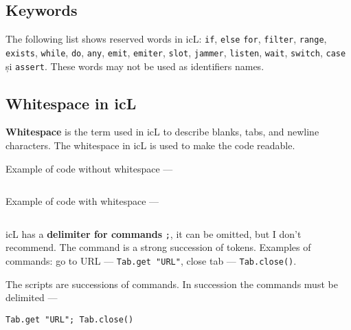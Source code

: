 \subsection{Keywords}

The following list shows reserved words in icL: \texttt{if}, \texttt{else} \texttt{for}, \texttt{filter}, \texttt{range}, \texttt{exists}, \texttt{while}, \texttt{do}, \texttt{any}, \texttt{emit}, \texttt{emiter}, \texttt{slot}, \texttt{jammer}, \texttt{listen}, \texttt{wait}, \texttt{switch}, \texttt{case} și \texttt{assert}. These words may not be used as identifiers names.

\subsection{Whitespace in icL}

\textbf{Whitespace} is the term used in icL to describe blanks, tabs, and newline characters. The whitespace in icL is used to make the code readable.

Example of code without whitespace —

\inputminted[linenos]{icl}{../sources/unreadable.icL}

Example of code with whitespace —

\inputminted[linenos]{icl}{../sources/readable.icL}

icL has a \textbf{delimiter for commands} \texttt{;}, it can be omitted, but I don't recommend. The command is a  strong succession of tokens. Examples of commands: go to URL — \texttt{Tab.get "URL"}, close tab — \texttt{Tab.close()}.

The scripts are successions of commands. In succession the commands must be delimited —
\begin{verbatim}
Tab.get "URL"; Tab.close()
\end{verbatim}
